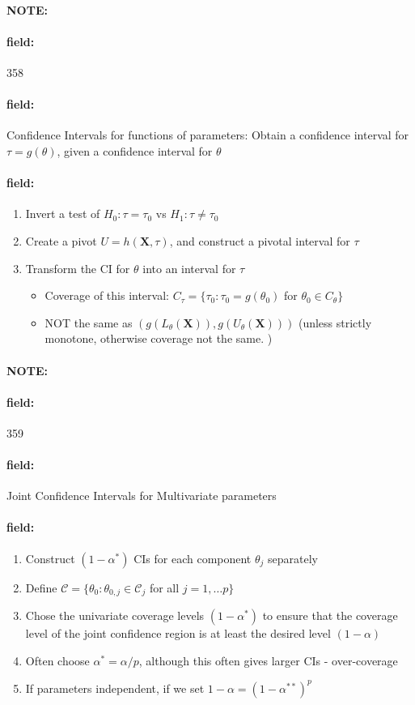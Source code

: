 \documentclass[12pt]{article}
\newenvironment{note}{\paragraph{NOTE:}}{}
\newenvironment{field}{\paragraph{field:}}{}
\begin{document}
\begin{note}
    \begin{field}
        \tiny 358
    \end{field}
    \begin{field}
        Confidence Intervals for functions of parameters: Obtain a confidence interval for $\tau = g(\theta)$, given a confidence interval for $\theta$
    \end{field}
    \begin{field}
        \begin{enumerate}
          \item Invert a test of $H_0: \tau = \tau_0$ vs $H_1: \tau \neq \tau_0$
          \item Create a pivot $U = h(\mathbf{X},\tau)$, and construct a pivotal interval for $\tau$
          \item Transform the CI for $\theta$ into an interval for $\tau$
          \begin{itemize}
            \item Coverage of this interval: $C_\tau = \{\tau_0 : \tau_0 = g(\theta_0)$ for $\theta_0 \in C_\theta\}$
            \item NOT the same as $(g(L_\theta(\mathbf{X})), g(U_\theta(\mathbf{X})))$ (unless strictly monotone, otherwise coverage not the same. )
          \end{itemize}
        \end{enumerate}
    \end{field}
\end{note}

\begin{note}
    \begin{field}
        \tiny 359
    \end{field}
    \begin{field}
        Joint Confidence Intervals for Multivariate parameters
    \end{field}
    \begin{field}
        \begin{enumerate}
          \item Construct $(1 - \alpha^*)$ CIs for each component $\theta_j$ separately
          \item Define $\mathscr{C } = \{\theta_0: \theta_{0,j} \in \mathscr{C}_j$ for all $j = 1, \ldots p\}$
          \item Chose the univariate coverage levels $(1 - \alpha^*)$ to ensure that the coverage level of the joint confidence region is at least the desired level $(1 - \alpha)$
          \item Often choose $\alpha^* = \alpha/p$, although this often gives larger CIs - over-coverage
          \item If parameters independent, if we set $1 - \alpha = (1 - \alpha^{**})^p$
        \end{enumerate}
    \end{field}
\end{note}
\end{document}
